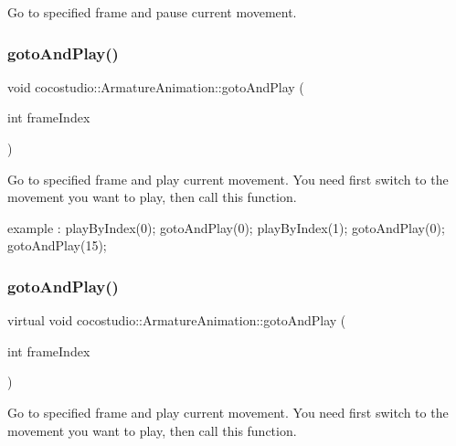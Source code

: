 Go to specified frame and pause current movement. \mbox{\label{classcocostudio_1_1ArmatureAnimation_a377c9c33f633982c01c6c245b6eaa41e}} 
\subsubsection{\texorpdfstring{goto\+And\+Play()}{gotoAndPlay()}\hspace{0.1cm}{\footnotesize\ttfamily [1/2]}}
{\footnotesize\ttfamily void cocostudio\+::\+Armature\+Animation\+::goto\+And\+Play (\begin{DoxyParamCaption}\item[{int}]{frame\+Index }\end{DoxyParamCaption})\hspace{0.3cm}{\ttfamily [virtual]}}

Go to specified frame and play current movement. You need first switch to the movement you want to play, then call this function.

example \+: play\+By\+Index(0); goto\+And\+Play(0); play\+By\+Index(1); goto\+And\+Play(0); goto\+And\+Play(15); \mbox{\label{classcocostudio_1_1ArmatureAnimation_a24a591185feda3b3874c5d66bc01d9a7}} 
\subsubsection{\texorpdfstring{goto\+And\+Play()}{gotoAndPlay()}\hspace{0.1cm}{\footnotesize\ttfamily [2/2]}}
{\footnotesize\ttfamily virtual void cocostudio\+::\+Armature\+Animation\+::goto\+And\+Play (\begin{DoxyParamCaption}\item[{int}]{frame\+Index }\end{DoxyParamCaption})\hspace{0.3cm}{\ttfamily [virtual]}}

Go to specified frame and play current movement. You need first switch to the movement you want to play, then call this function.

